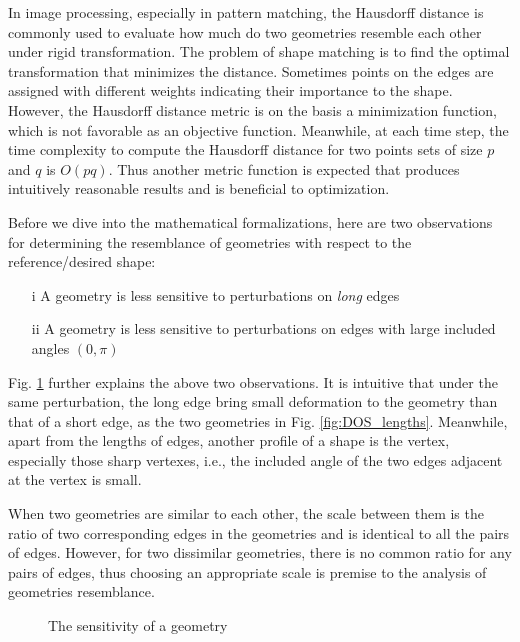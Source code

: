 \documentclass[times]{rncauth}
\begin{document}
In image processing, especially in pattern matching, the Hausdorff distance is commonly used to evaluate how much do two geometries resemble each other under rigid transformation\cite{Hutten93hausdorff}. The problem of shape matching is to find the optimal transformation that minimizes the distance. Sometimes points on the edges are assigned with different weights indicating their importance to the shape. However, the Hausdorff distance metric is on the basis a minimization function, which is  not favorable as an objective function. Meanwhile, at each  time step, the time complexity to compute the Hausdorff distance  for two points sets of size $p$ and $q$ is $O(pq)$. Thus another metric function is expected that produces intuitively reasonable results and is beneficial to optimization.

Before we dive into the mathematical formalizations, here are two observations for determining the resemblance of  geometries with respect to the reference/desired shape:
\begin{itemize}
  \item [i] A geometry is less sensitive to perturbations on \emph{long} edges
  \item [ii] A geometry is less sensitive to perturbations on edges with large included angles $(0,\pi)$
\end{itemize}
Fig. \ref{fig:DOS} further explains the above two observations.
It is intuitive that  under the same perturbation, the long edge bring small deformation to the geometry
than that of a short edge, as the two geometries in Fig. \ref{fig:DOS_lengths}.
Meanwhile, apart from the lengths of edges, another profile of a shape is the vertex,
especially those sharp vertexes, i.e., the included angle of the two  edges adjacent at  the vertex is small.


 When two geometries are similar to each other, the scale between them is the ratio of two corresponding edges in the geometries and is identical to all  the pairs of edges. However, for two dissimilar geometries, there is no common ratio for any pairs of edges, thus choosing an appropriate scale is premise to the analysis of geometries resemblance.

\begin{figure}
\caption{The sensitivity  of a geometry}\label{fig:DOS}
\end{figure}
\end{document}
